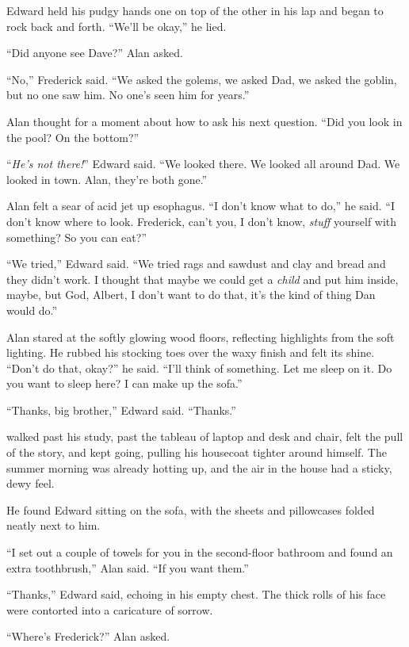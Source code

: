 Edward held his pudgy hands one on top of the other in his lap and
began to rock back and forth.  ``We'll be okay,'' he lied.

``Did anyone see Dave?'' Alan asked.

``No,'' Frederick said.  ``We asked the golems, we asked Dad, we asked
the goblin, but no one saw him.  No one's seen him for years.''

Alan thought for a moment about how to ask his next question.  ``Did
you look in the pool?  On the bottom?''

``\textit{He's not there!}'' Edward said.  ``We looked there.  We
looked all around Dad.  We looked in town.  Alan, they're both gone.''

Alan felt a sear of acid jet up esophagus.  ``I don't know what to
do,'' he said.  ``I don't know where to look.  Frederick, can't you, I
don't know, \textit{stuff} yourself with something?  So you can eat?''

``We tried,'' Edward said.  ``We tried rags and sawdust and clay and
bread and they didn't work.  I thought that maybe we could get a
\textit{child} and put him inside, maybe, but God, Albert, I don't
want to do that, it's the kind of thing Dan would do.''

Alan stared at the softly glowing wood floors, reflecting highlights
from the soft lighting.  He rubbed his stocking toes over the waxy
finish and felt its shine.  ``Don't do that, okay?'' he said.  ``I'll
think of something.  Let me sleep on it.  Do you want to sleep here? 
I can make up the sofa.''

``Thanks, big brother,'' Edward said.  ``Thanks.''

 walked past his study, past the tableau of laptop and desk and
chair, felt the pull of the story, and kept going, pulling his
housecoat tighter around himself.  The summer morning was already
hotting up, and the air in the house had a sticky, dewy feel.

He found Edward sitting on the sofa, with the sheets and pillowcases
folded neatly next to him.

``I set out a couple of towels for you in the second-floor bathroom
and found an extra toothbrush,'' Alan said.  ``If you want them.''

``Thanks,'' Edward said, echoing in his empty chest.  The thick rolls
of his face were contorted into a caricature of sorrow.

``Where's Frederick?'' Alan asked.

